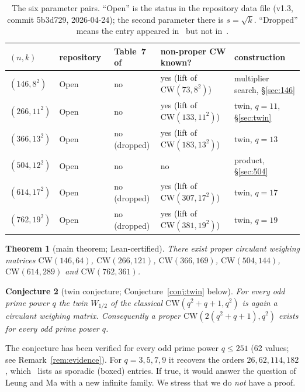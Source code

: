 \documentclass[11pt]{article}
\numberwithin{equation}{section}
\newtheorem{theorem}{Theorem}[section]
\newtheorem{conjecture}[theorem]{Conjecture}
\theoremstyle{definition}
\theoremstyle{remark}
\newcommand{\CW}{\mathrm{CW}}
\begin{document}
\begin{table}[h]
\centering\small
\setlength{\tabcolsep}{4pt}
\begin{tabular}{@{}lllll@{}}
\toprule
$(n,k)$ & repository~\cite{GordonRepo} & Table~7 of~\cite{G26} & non-proper CW known? & construction\\
\midrule
$(146,8^2)$  & Open & no & yes (lift of $\CW(73,8^2)$) & multiplier search, \S\ref{sec:146}\\
$(266,11^2)$ & Open & no & yes (lift of $\CW(133,11^2)$) & twin, $q=11$, \S\ref{sec:twin}\\
$(366,13^2)$ & Open & no (dropped) & yes (lift of $\CW(183,13^2)$) & twin, $q=13$\\
$(504,12^2)$ & Open & no & no & product, \S\ref{sec:504}\\
$(614,17^2)$ & Open & no (dropped) & yes (lift of $\CW(307,17^2)$) & twin, $q=17$\\
$(762,19^2)$ & Open & no (dropped) & yes (lift of $\CW(381,19^2)$) & twin, $q=19$\\
\bottomrule
\end{tabular}
\caption{The six parameter pairs. ``Open'' is the status in the repository data file (v1.3, commit
5b3d729, 2026-04-24); the second parameter there is $s=\sqrt k$. ``Dropped'' means the entry
appeared in~\cite[Table~11]{AGZ} but not in~\cite[Table~7]{G26}.}
\label{tab:results}
\end{table}

\begin{theorem}[main theorem; Lean-certified]\label{thm:main}
There exist proper circulant weighing matrices $\CW(146,64)$, $\CW(266,121)$, $\CW(366,169)$,
$\CW(504,144)$, $\CW(614,289)$ and $\CW(762,361)$.
\end{theorem}

\begin{conjecture}[twin conjecture; Conjecture~\ref{conj:twin} below]
For every odd prime power $q$ the twin $W_{1/2}$ of the classical $\CW(q^2+q+1,q^2)$ is again a
circulant weighing matrix. Consequently a proper $\CW(2(q^2+q+1),q^2)$ exists for every odd
prime power $q$.
\end{conjecture}

The conjecture has been verified for every odd prime power $q\le251$ (62 values; see
Remark~\ref{rem:evidence}). For
$q=3,5,7,9$ it recovers the orders $26,62,114,182$, which~\cite{G26} lists as sporadic (boxed)
entries. If true, it would answer the question of Leung and Ma with a new infinite family. We stress that we do
\emph{not} have a proof.
\end{document}
